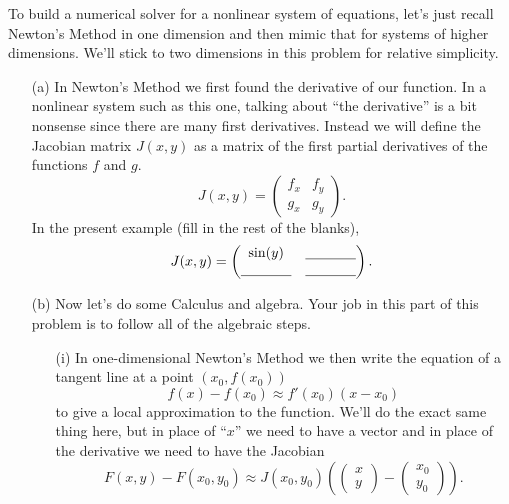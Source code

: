 \begin{problem}
To build a numerical solver for a nonlinear system of equations, let's just recall
Newton's Method in one dimension and then mimic that for systems of higher dimensions.
We'll stick to two dimensions in this problem for relative simplicity.
\begin{enumerate}
    \item[(a)] In Newton's Method we first found the derivative of our function.  In a
        nonlinear system such as this one, talking about ``the derivative'' is a bit
        nonsense since there are many first derivatives.  Instead we will define the
        Jacobian matrix $J(x,y)$ as a matrix of the first partial derivatives of the
        functions $f$ and $g$.
        \[ J(x,y) = \begin{pmatrix} f_x & f_y \\ g_x & g_y \end{pmatrix}. \]
        In the present example (fill in the rest of the blanks),
        \[ J(x,y) = \begin{pmatrix} \sin(y) &
                \underline{\hspace{0.5in}} \\  \underline{\hspace{0.5in}} &
            \underline{\hspace{0.5in}} \end{pmatrix}. \]
    \item[(b)] Now let's do some Calculus and algebra.  Your job in this part of this
        problem is to follow all of the algebraic steps.
        \begin{enumerate}
            \item[(i)] In one-dimensional Newton's Method we then write the equation of a tangent
        line at a point $(x_0, f(x_0))$
        \[ f(x) - f(x_0) \approx f'(x_0)(x-x_0) \]
        to give a local approximation to the function.  
        We'll do the exact same thing here, but in place of ``$x$'' we need to have a
        vector and in place of the derivative we need to have the Jacobian
        \[ F(x,y) - F(x_0,y_0) \approx J(x_0, y_0) \left( \begin{pmatrix} x \\ y
        \end{pmatrix} - \begin{pmatrix} x_0 \\ y_0 \end{pmatrix} \right). \]

\end{enumerate}
\end{enumerate}
\end{problem}
